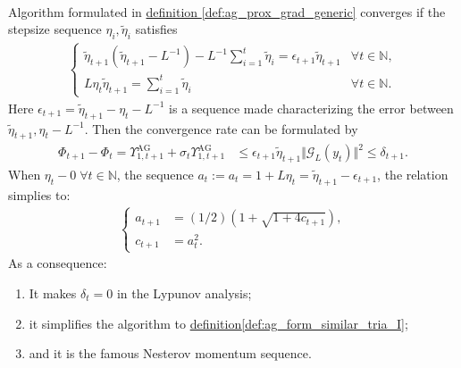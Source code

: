 \documentclass[12pt]{article}
\begin{document}
        \begin{theorem}
            \label{thm:ag_generic_stepsize_constrants}
            \;\\
            Algorithm formulated in 
            \hyperref[def:ag_prox_grad_generic]{definition \ref*{def:ag_prox_grad_generic}}
            converges if the stepsize sequence $\eta_i, \tilde \eta_{i}$ satisfies
            \begin{align*}
                \begin{cases}
                    \tilde \eta_{t + 1} (\tilde \eta_{t + 1} - L^{-1})
                    - L^{-1} \sum_{i= 1}^{t}\tilde \eta_i 
                    = 
                    \epsilon_{t + 1} \tilde \eta_{t + 1}
                    & \forall t \in \mathbb N, 
                    \\
                    L \eta_t \tilde \eta_{t + 1} = \sum_{i=1}^{t}\tilde \eta_i 
                    & \forall t \in \mathbb N. 
                \end{cases}
            \end{align*}
            Here $\epsilon_{t + 1} = \tilde \eta_{t + 1} - \eta_t - L^{-1}$ is a sequence made characterizing the error between $\tilde \eta_{t + 1}, \eta_t - L^{-1}$. 
            Then the convergence rate can be formulated by
            \begin{align*}
                \Phi_{t + 1} - \Phi_t =
                \Upsilon_{1, t + 1}^\text{AG} + 
                \sigma_t\Upsilon_{1, t + 1}^{\text{AG}} 
                &\le \epsilon_{t + 1}\tilde\eta_{t + 1} \Vert \mathcal G_L(y_t)\Vert^2 \le \delta_{t + 1}.
            \end{align*}
            When $\eta_t - 0 \;\forall t\in \mathbb N$, the sequence $a_t:= a_t = 1 + L \eta_t = \tilde \eta_{t + 1} - \epsilon_{t + 1}$, the relation simplies to: 
            \begin{align*}
                \begin{cases}
                    a_{t + 1} &= (1/2)\left(
                    1 + \sqrt{1 + 4 c_{t + 1}}
                    \right), 
                    \\
                    c_{t + 1} &= a_t^2.     
                \end{cases}
            \end{align*}
            As a consequence: 
            \begin{enumerate}
                \item It makes $\delta_{t} = 0$ in the Lypunov analysis; 
                \item it simplifies the algorithm to
                \hyperref[def:ag_form_similar_tria_I]{definition\ref*{def:ag_form_similar_tria_I}}; 
                \item and it is the famous Nesterov momentum sequence. 
            \end{enumerate}
            
            
        \end{theorem}
\end{document}
